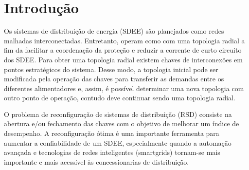 \section{Introdução}

Os sistemas de distribuição de energia (SDEE) são planejados como redes malhadas interconectadas.
Entretanto, operam como com uma topologia radial a fim da facilitar a coordenação da proteção e reduzir a corrente de curto circuito dos SDEE.
Para obter uma topologia radial existem chaves de interconexões em pontos estratégicos do sistema.
Desse modo, a topologia inicial pode ser modificada pela operação das chaves para transferir as demandas entre os diferentes alimentadores e, assim, é possível determinar uma nova topologia com outro ponto de operação, contudo deve continuar sendo uma topologia radial.

O problema de reconfiguração de sistemas de distribuição (RSD) consiste na abertura e/ou fechamento das chaves com o objetivo de melhorar um índice de desempenho. 
A reconfiguração ótima é uma importante ferramenta para aumentar a confiabilidade de um SDEE, especialmente quando a automação avançada e tecnologias de redes inteligentes (smartgrids) tornam-se mais importante e mais acessível às concessionarias de distribuição.





